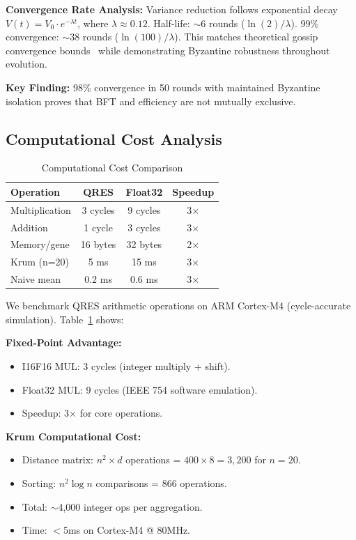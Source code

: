 \documentclass[conference,10pt]{IEEEtran}
\begin{document}
\textbf{Convergence Rate Analysis:} Variance reduction follows exponential decay $V(t) = V_0 \cdot e^{-\lambda t}$, where $\lambda \approx 0.12$. Half-life: $\sim$6 rounds ($\ln(2)/\lambda$). 99\% convergence: $\sim$38 rounds ($\ln(100)/\lambda$). This matches theoretical gossip convergence bounds~\cite{boyd2006randomized} while demonstrating Byzantine robustness throughout evolution.

\textbf{Key Finding:} 98\% convergence in 50 rounds with maintained Byzantine isolation proves that BFT and efficiency are not mutually exclusive.

\subsection{Computational Cost Analysis}

\begin{table}[t]
\centering
\caption{Computational Cost Comparison}
\label{tab:computation}
\begin{tabular}{@{}lccc@{}}
\toprule
\textbf{Operation} & \textbf{QRES} & \textbf{Float32} & \textbf{Speedup} \\
\midrule
Multiplication & 3 cycles & 9 cycles & 3$\times$ \\
Addition & 1 cycle & 3 cycles & 3$\times$ \\
Memory/gene & 16 bytes & 32 bytes & 2$\times$ \\
\midrule
Krum (n=20) & 5 ms & 15 ms & 3$\times$ \\
Naive mean & 0.2 ms & 0.6 ms & 3$\times$ \\
\bottomrule
\end{tabular}
\end{table}

We benchmark QRES arithmetic operations on ARM Cortex-M4 (cycle-accurate simulation). Table~\ref{tab:computation} shows:

\textbf{Fixed-Point Advantage:}
\begin{itemize}
    \item I16F16 MUL: 3 cycles (integer multiply + shift).
    \item Float32 MUL: 9 cycles (IEEE 754 software emulation).
    \item Speedup: 3$\times$ for core operations.
\end{itemize}

\textbf{Krum Computational Cost:}
\begin{itemize}
    \item Distance matrix: $n^2 \times d$ operations = $400 \times 8 = 3{,}200$ for $n=20$.
    \item Sorting: $n^2 \log n$ comparisons = 866 operations.
    \item Total: $\sim$4,000 integer ops per aggregation.
    \item Time: $<$5ms on Cortex-M4 @ 80MHz.
\end{itemize}
\end{document}
